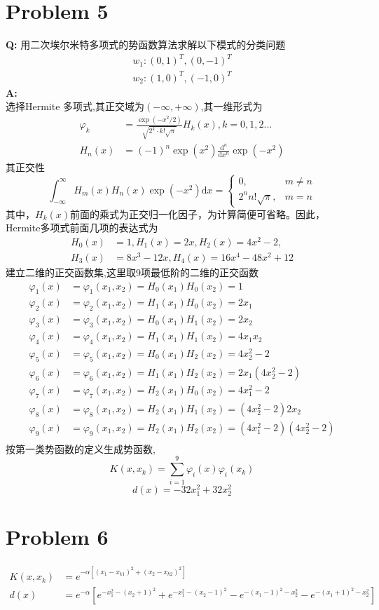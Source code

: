 \documentclass[12pt,a4paper]{article}
\begin{document}
\section{Problem 5} 
\textbf{Q: } 用二次埃尔米特多项式的势函数算法求解以下模式的分类问题 
   \[  \begin{split} 
 		w_1: {(0, 1)^T, (0, -1)^T} \\
		w_2: {(1, 0)^T, (-1, 0)^T}
	  \end{split} 	
	\]
\textbf{A: } \\
选择Hermite 多项式,其正交域为$(-\infty,+\infty)$,其一维形式为
\[ \begin{split} 
	\varphi_k &=  \frac{\exp(-x^2/2)}{\sqrt{2^k\cdot k!\sqrt{\pi}}}H_k(x) , k = 0,1,2... \\
	H_n(x) &= (-1)^n \exp(x^2) \frac{\mathrm{d}^n}{\mathrm{d}x^n}\exp(-x^2)
   \end{split} 		
\]
其正交性
\[
	\int_{-\infty}^{\infty} H_m(x)H_n(x) \exp(-x^2)\mathrm{d}x = \left\lbrace
	 \begin{split}
		 0, & m\neq n\\
		 2^n n!\sqrt{\pi}, & m = n
	 \end{split}
	\right. 
\]
其中，$H_k(x)$前面的乘式为正交归一化因子，为计算简便可省略。因此，Hermite多项式前面几项的表达式为 
\[ \begin{split} 
		H_0(x) &= 1, H_1(x) = 2x, H_2(x) = 4x^2 - 2, \\
		H_3(x) &= 8x^3 - 12x, H_4(x)  = 16x^4 - 48x^2 + 12
	\end{split} 
\]
建立二维的正交函数集,这里取$9$项最低阶的二维的正交函数
\[ \begin{split} 
	\varphi_1(x) &= \varphi_1(x_1,x_2) = H_0(x_1)H_0(x_2) = 1 \\
	\varphi_2(x) &= \varphi_2(x_1,x_2) = H_1(x_1)H_0(x_2) = 2x_1 \\
	\varphi_3(x) &= \varphi_3(x_1,x_2) = H_0(x_1)H_1(x_2) = 2x_2 \\
	\varphi_4(x) &= \varphi_4(x_1,x_2) = H_1(x_1)H_1(x_2) = 4x_1x_2 \\
	\varphi_5(x) &= \varphi_5(x_1,x_2) = H_0(x_1)H_2(x_2) = 4x_2^2 - 2 \\
	\varphi_6(x) &= \varphi_6(x_1,x_2) = H_1(x_1)H_2(x_2) = 2x_1(4x_2^2-2)  \\	
	\varphi_7(x) &= \varphi_7(x_1,x_2) = H_2(x_1)H_0(x_2) = 4x_1^2 - 2\\
	\varphi_8(x) &= \varphi_8(x_1,x_2) = H_2(x_1)H_1(x_2) = (4x_2^2 - 2)2x_2 \\
	\varphi_9(x) &= \varphi_9(x_1,x_2) = H_2(x_1)H_2(x_2) = (4x_1^2 - 2)(4x_2^2 - 2) \\
 \end{split} 
\]
按第一类势函数的定义生成势函数,
\[
	K(x,x_k) = \sum_{i=1}^{9}\varphi_i(x)\varphi_i(x_k)  
\]
\[
 d(x) = -32x_1^2+32x_2^2
\] 
\section{Problem 6}
\[
\begin{split}
  K(x,x_k) &= e^{-\alpha[(x_1-x_{k1})^2+(x_2-x_{k2})^2]} \\
  d(x) &= e^{-\alpha}[e^{-x_1^2-(x_2+1)^2} + e^{-x_1^2-(x_2-1)^2} - e^{-(x_1-1)^2-x_2^2}-e^{-(x_1+1)^2-x_2^2}]
\end{split}
\]
\end{document}
